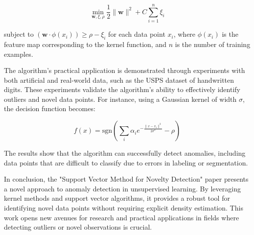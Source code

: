 \documentclass{article}
\begin{document}
\[ \min_{\mathbf{w}, \xi, \rho} \frac{1}{2}\|\mathbf{w}\|^2 + C \sum_{i=1}^{n} \xi_i \]

subject to \((\mathbf{w} \cdot \phi(x_i)) \geq \rho - \xi_i\) for each data point \(x_i\), where \(\phi(x_i)\) is the feature map corresponding to the kernel function, and \(n\) is the number of training examples.


The algorithm's practical application is demonstrated through experiments with both artificial and real-world data, such as the USPS dataset of handwritten digits. These experiments validate the algorithm's ability to effectively identify outliers and novel data points. For instance, using a Gaussian kernel of width \(σ\), the decision function becomes:

\[ f(x) = \text{sgn}\left( \sum_{i} \alpha_i e^{-\frac{\|x - x_i\|^2}{2\sigma^2}} - \rho \right) \]

The results show that the algorithm can successfully detect anomalies, including data points that are difficult to classify due to errors in labeling or segmentation.


In conclusion, the "Support Vector Method for Novelty Detection" paper presents a novel approach to anomaly detection in unsupervised learning. By leveraging kernel methods and support vector algorithms, it provides a robust tool for identifying novel data points without requiring explicit density estimation. This work opens new avenues for research and practical applications in fields where detecting outliers or novel observations is crucial.
\end{document}
